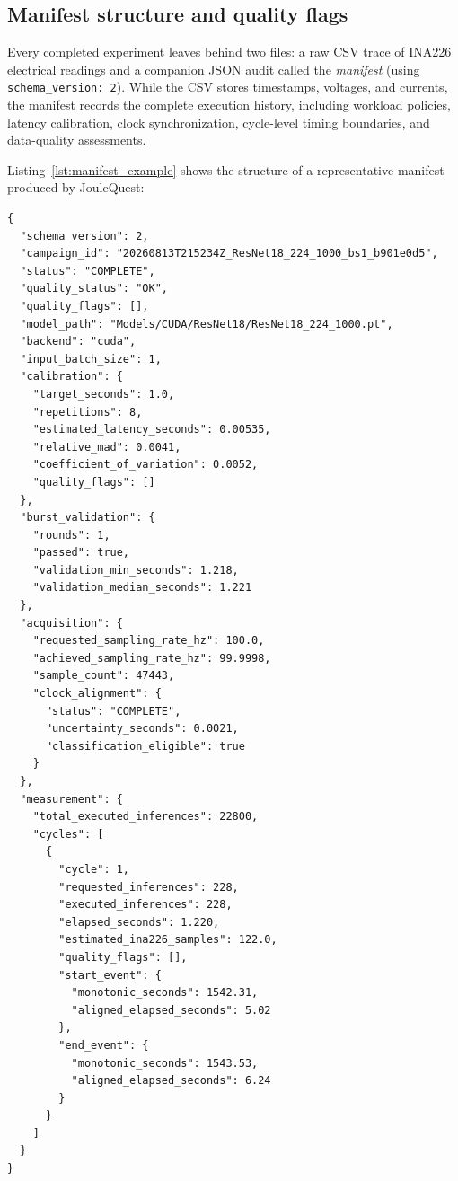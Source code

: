\subsection{Manifest structure and quality flags}
\label{subsec:manifest_structure}

Every completed experiment leaves behind two files: a raw CSV trace of INA226 electrical readings and a companion JSON audit called the \emph{manifest} (using \texttt{schema\_version: 2}). While the CSV stores timestamps, voltages, and currents, the manifest records the complete execution history, including workload policies, latency calibration, clock synchronization, cycle-level timing boundaries, and data-quality assessments.

Listing~\ref{lst:manifest_example} shows the structure of a representative manifest produced by JouleQuest:

\begin{lstlisting}[caption={Representative structure of a JouleQuest manifest JSON (\texttt{schema\_version: 2}).}, label={lst:manifest_example}]
{
  "schema_version": 2,
  "campaign_id": "20260813T215234Z_ResNet18_224_1000_bs1_b901e0d5",
  "status": "COMPLETE",
  "quality_status": "OK",
  "quality_flags": [],
  "model_path": "Models/CUDA/ResNet18/ResNet18_224_1000.pt",
  "backend": "cuda",
  "input_batch_size": 1,
  "calibration": {
    "target_seconds": 1.0,
    "repetitions": 8,
    "estimated_latency_seconds": 0.00535,
    "relative_mad": 0.0041,
    "coefficient_of_variation": 0.0052,
    "quality_flags": []
  },
  "burst_validation": {
    "rounds": 1,
    "passed": true,
    "validation_min_seconds": 1.218,
    "validation_median_seconds": 1.221
  },
  "acquisition": {
    "requested_sampling_rate_hz": 100.0,
    "achieved_sampling_rate_hz": 99.9998,
    "sample_count": 47443,
    "clock_alignment": {
      "status": "COMPLETE",
      "uncertainty_seconds": 0.0021,
      "classification_eligible": true
    }
  },
  "measurement": {
    "total_executed_inferences": 22800,
    "cycles": [
      {
        "cycle": 1,
        "requested_inferences": 228,
        "executed_inferences": 228,
        "elapsed_seconds": 1.220,
        "estimated_ina226_samples": 122.0,
        "quality_flags": [],
        "start_event": {
          "monotonic_seconds": 1542.31,
          "aligned_elapsed_seconds": 5.02
        },
        "end_event": {
          "monotonic_seconds": 1543.53,
          "aligned_elapsed_seconds": 6.24
        }
      }
    ]
  }
}
\end{lstlisting}


